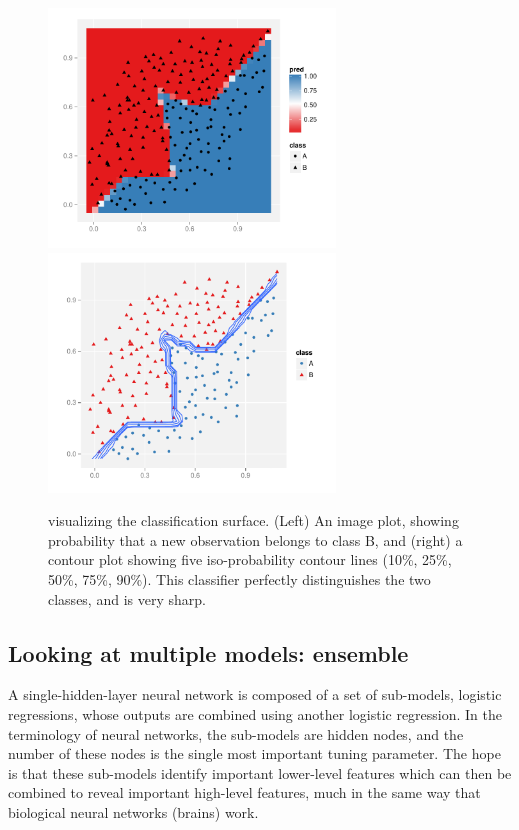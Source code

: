 \documentclass[preprint]{imsart}
\begin{document}
\begin{figure}[htbp]
  \centering
    \includegraphics[height=2.5in]{nnet-best-fill}
    \includegraphics[height=2.5in]{nnet-best-contour}
  \caption{visualizing the classification surface.  (Left) An image plot, showing probability that a new observation belongs to class B, and (right) a contour plot showing five iso-probability contour lines (10\%, 25\%, 50\%, 75\%, 90\%).  This classifier perfectly distinguishes the two classes, and is very sharp.}
  \label{fig:nnet-best}
\end{figure}

\subsection{Looking at multiple models: ensemble}
\label{sub:ensemble}

A single-hidden-layer neural network is composed of a set of sub-models, logistic regressions, whose outputs are combined using another logistic regression.  In the terminology of neural networks, the sub-models are hidden nodes, and the number of these nodes is the single most important tuning parameter.  The hope is that these sub-models  identify important lower-level features which can then be combined to reveal important high-level features, much in the same way that biological neural networks (brains) work.
\end{document}
